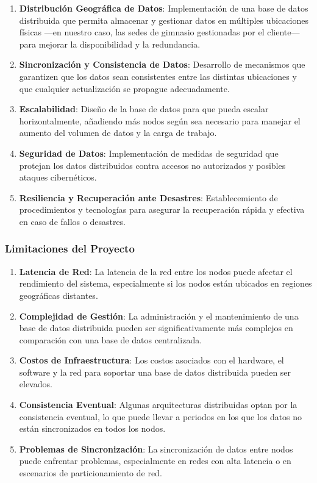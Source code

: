 \documentclass[spanish,12pt]{article}
\providecommand{\tightlist}{\setlength{\itemsep}{0pt}\setlength{\parskip}{0pt}}
\begin{document}
\begin{enumerate}
\def\labelenumi{\arabic{enumi}.}
\tightlist
\item
  \textbf{Distribución Geográfica de Datos}: Implementación de una base
  de datos distribuida que permita almacenar y gestionar datos en
  múltiples ubicaciones físicas ---en nuestro caso, las sedes de
  gimnasio gestionadas por el cliente--- para mejorar la disponibilidad
  y la redundancia.
\item
  \textbf{Sincronización y Consistencia de Datos}: Desarrollo de
  mecanismos que garantizen que los datos sean consistentes entre las
  distintas ubicaciones y que cualquier actualización se propague
  adecuadamente.
\item
  \textbf{Escalabilidad}: Diseño de la base de datos para que pueda
  escalar horizontalmente, añadiendo más nodos según sea necesario para
  manejar el aumento del volumen de datos y la carga de trabajo.
\item
  \textbf{Seguridad de Datos}: Implementación de medidas de seguridad
  que protejan los datos distribuidos contra accesos no autorizados y
  posibles ataques cibernéticos.
\item
  \textbf{Resiliencia y Recuperación ante Desastres}: Establecemiento de
  procedimientos y tecnologías para asegurar la recuperación rápida y
  efectiva en caso de fallos o desastres.
\end{enumerate}

\subsubsection{Limitaciones del
Proyecto}\label{limitaciones-del-proyecto}

\begin{enumerate}
\def\labelenumi{\arabic{enumi}.}
\tightlist
\item
  \textbf{Latencia de Red}: La latencia de la red entre los nodos puede
  afectar el rendimiento del sistema, especialmente si los nodos están
  ubicados en regiones geográficas distantes.
\item
  \textbf{Complejidad de Gestión}: La administración y el mantenimiento
  de una base de datos distribuida pueden ser significativamente más
  complejos en comparación con una base de datos centralizada.
\item
  \textbf{Costos de Infraestructura}: Los costos asociados con el
  hardware, el software y la red para soportar una base de datos
  distribuida pueden ser elevados.
\item
  \textbf{Consistencia Eventual}: Algunas arquitecturas distribuidas
  optan por la consistencia eventual, lo que puede llevar a periodos en
  los que los datos no están sincronizados en todos los nodos.
\item
  \textbf{Problemas de Sincronización}: La sincronización de datos entre
  nodos puede enfrentar problemas, especialmente en redes con alta
  latencia o en escenarios de particionamiento de red.
\end{enumerate}
\end{document}
